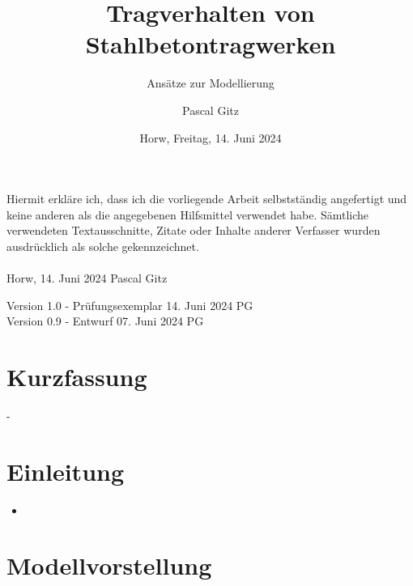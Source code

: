 \documentclass[
  10pt,
  letterpaper,
]{scrreprt}
\title{Tragverhalten von Stahlbetontragwerken}
\subtitle
{Ansätze zur Modellierung}
\date{\large Horw, Freitag, 14. Juni 2024}
\author{Pascal Gitz}
\providecommand{\tightlist}{%
  \setlength{\itemsep}{0pt}\setlength{\parskip}{0pt}}\usepackage{longtable,booktabs,array}
\renewcommand*\contentsname{Inhaltsverzeichnis}
\newcommand\contentsname{Inhaltsverzeichnis}
\begin{document}
\maketitle


Hiermit erkläre ich, dass ich die vorliegende Arbeit selbstständig angefertigt und keine anderen als die angegebenen Hilfsmittel verwendet habe. Sämtliche verwendeten Textausschnitte, Zitate oder Inhalte anderer Verfasser wurden ausdrücklich als solche gekennzeichnet.\\%
%
\\%
%
Horw, 14. Juni 2024 \hfill Pascal Gitz%

\vfill

Version 1.0 - Prüfungsexemplar \hfill 14. Juni 2024 \quad \quad \quad \quad \quad PG\\
Version 0.9 - Entwurf \hfill 07. Juni 2024 \quad \quad \quad \quad \quad PG\\

\newpage

\chapter*{Kurzfassung}

-

\renewcommand*\contentsname{Inhaltsverzeichnis}
{
\hypersetup{linkcolor=}
\setcounter{tocdepth}{1}
\tableofcontents
}
\listoffigures
\listoftables
{}

\chapter{Einleitung}\label{einleitung}

\begin{itemize}
\tightlist
\item
\end{itemize}


\chapter{Modellvorstellung}\label{sec-modellvorstellung}
\end{document}
